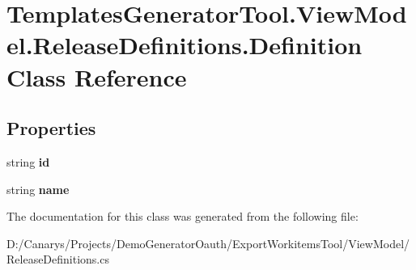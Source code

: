 \hypertarget{class_templates_generator_tool_1_1_view_model_1_1_release_definitions_1_1_definition}{}\section{Templates\+Generator\+Tool.\+View\+Model.\+Release\+Definitions.\+Definition Class Reference}
\label{class_templates_generator_tool_1_1_view_model_1_1_release_definitions_1_1_definition}
\subsection*{Properties}
\begin{DoxyCompactItemize}
\item 
\mbox{\label{class_templates_generator_tool_1_1_view_model_1_1_release_definitions_1_1_definition_aa520c465202dcc08f332038ceb9b0b88}} 
string {\bfseries id}
\item 
\mbox{\label{class_templates_generator_tool_1_1_view_model_1_1_release_definitions_1_1_definition_a6c1535e6002f659d38b0c41d37c07591}} 
string {\bfseries name}
\end{DoxyCompactItemize}


The documentation for this class was generated from the following file\+:\begin{DoxyCompactItemize}
\item 
D\+:/\+Canarys/\+Projects/\+Demo\+Generator\+Oauth/\+Export\+Workitems\+Tool/\+View\+Model/Release\+Definitions.\+cs\end{DoxyCompactItemize}
